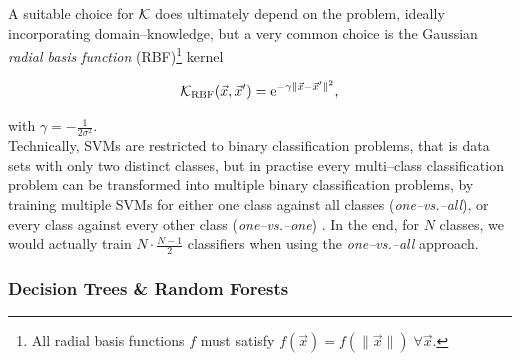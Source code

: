 A suitable choice for $\mathcal{K}$ does ultimately depend on the problem, ideally incorporating domain--knowledge, but a very common choice is the Gaussian \emph{radial basis function} (RBF)\footnote{All radial basis functions $f$ must satisfy $f(\vec x) = f(\|\vec x\|) \; \forall \vec x$.} kernel

\begin{equation}
\label{eq:rbf}
\mathcal{K}_{\text{RBF}}(\vec x, \vec x') = \mathrm{e}^{-\gamma \| \vec x - \vec x' \|^2},
\end{equation}

with $\gamma = -\frac{1}{2 \sigma^2}$.\\


Technically, SVMs are restricted to binary classification problems, that is data sets with only two distinct classes, but in practise every multi--class classification problem can be transformed into multiple binary classification problems, \eg by training multiple SVMs for either one class against all classes (\emph{one--vs.--all}), or every class against every other class (\emph{one--vs.--one}) \citep{knerr1990}. In the end, for $N$ classes, we would actually train $N \cdot \frac{N-1}{2}$ classifiers when using the \emph{one--vs.--all} approach.



\subsubsection{Decision Trees \& Random Forests}

